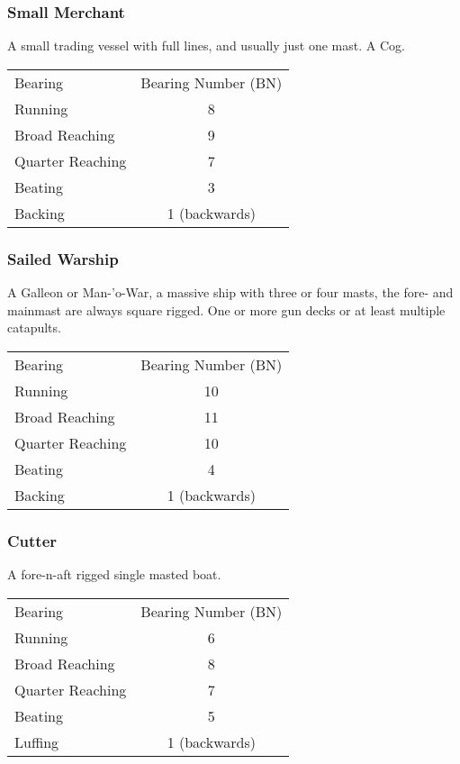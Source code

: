 \documentclass[11pt]{wbzine}
\begin{document}
\begin{multicols}{2}
\subsubsection{Small Merchant}

A small trading vessel with full lines, and usually just one mast. A
Cog.


\begin{tabularx}{\columnwidth}{Zc}
Bearing & Bearing Number (BN) \\
Running & 8 \\
Broad Reaching & 9 \\
Quarter Reaching & 7 \\
Beating & 3 \\
Backing & 1 (backwards) \\
\end{tabularx}

\subsubsection{Sailed Warship}

A Galleon or Man-'o-War, a massive ship with three or four masts, the
fore- and mainmast are always square rigged. One or more gun decks or at
least multiple catapults.


\begin{tabularx}{\columnwidth}{Zc}
Bearing & Bearing Number (BN) \\
Running & 10 \\
Broad Reaching & 11 \\
Quarter Reaching & 10 \\
Beating & 4 \\
Backing & 1 (backwards) \\
\end{tabularx}

\subsubsection{Cutter}

A fore-n-aft rigged single masted boat.


\begin{tabularx}{\columnwidth}{Zc}
Bearing & Bearing Number (BN) \\
Running & 6 \\
Broad Reaching & 8 \\
Quarter Reaching & 7 \\
Beating & 5 \\
Luffing & 1 (backwards) \\
\end{tabularx}


\end{multicols}
\end{document}
